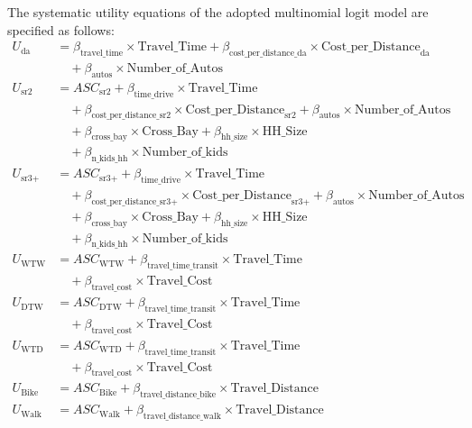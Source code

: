 The systematic utility equations of the adopted multinomial logit model are specified as follows:
\begin{align*}
U_{\textrm{da}} &= \beta_{\textrm{travel\_time}} \times \textrm{Travel\_Time} + \beta_{\textrm{cost\_per\_distance\_da}} \times \textrm{Cost\_per\_Distance}_{ \textrm{da} } \\
    &\quad + \beta_{\textrm{autos}} \times \textrm{Number\_of\_Autos} \\
U_{\textrm{sr2}} &= ASC_{\textrm{sr2}} + \beta_{\textrm{time\_drive}} \times \textrm{Travel\_Time} \\
    &\quad + \beta_{\textrm{cost\_per\_distance\_sr2}} \times \textrm{Cost\_per\_Distance}_{ \textrm{sr2} } + \beta_{\textrm{autos}}  \times \textrm{Number\_of\_Autos} \\
    &\quad + \beta_{\textrm{cross\_bay}} \times \textrm{Cross\_Bay} + \beta_{\textrm{hh\_size}} \times \textrm{HH\_Size} \\
    &\quad + \beta_{\textrm{n\_kids\_hh}} \times \textrm{Number\_of\_kids} \\
U_{\textrm{sr3+}} &= ASC_{\textrm{sr3+}} + \beta_{\textrm{time\_drive}} \times \textrm{Travel\_Time} \\
    &\quad + \beta_{\textrm{cost\_per\_distance\_sr3+}} \times \textrm{Cost\_per\_Distance}_{\textrm{sr3+}} + \beta_{\textrm{autos}}  \times \textrm{Number\_of\_Autos} \\
    &\quad + \beta_{\textrm{cross\_bay}} \times \textrm{Cross\_Bay} + \beta_{\textrm{hh\_size}} \times \textrm{HH\_Size} \\
    &\quad + \beta_{\textrm{n\_kids\_hh}} \times \textrm{Number\_of\_kids} \\
U_{\textrm{WTW}} &= ASC_{\textrm{WTW}} + \beta_{\textrm{travel\_time\_transit}} \times \textrm{Travel\_Time} \\
    &\quad + \beta_{\textrm{travel\_cost}} \times \textrm{Travel\_Cost} \\
U_{\textrm{DTW}} &= ASC_{\textrm{DTW}} + \beta_{\textrm{travel\_time\_transit}} \times \textrm{Travel\_Time} \\
    &\quad + \beta_{\textrm{travel\_cost}} \times \textrm{Travel\_Cost} \\
U_{\textrm{WTD}} &= ASC_{\textrm{WTD}} + \beta_{\textrm{travel\_time\_transit}} \times \textrm{Travel\_Time} \\
    &\quad + \beta_{\textrm{travel\_cost}} \times \textrm{Travel\_Cost} \\
U_{\textrm{Bike}} &= ASC_{\textrm{Bike}} + \beta_{\textrm{travel\_distance\_bike}} \times \textrm{Travel\_Distance} \\
U_{\textrm{Walk}} &= ASC_{\textrm{Walk}} + \beta_{\textrm{travel\_distance\_walk}} \times \textrm{Travel\_Distance} \\
\end{align*}

